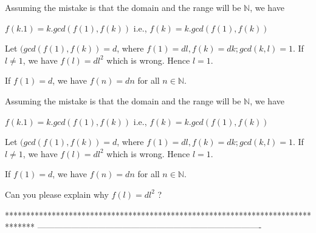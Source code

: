 \begin{solution}
	Assuming the mistake is that the domain and the range will be $\mathbb{N}$, we have

$f(k.1)=k.gcd(f(1),f(k))$
i.e., $f(k)=k.gcd(f(1),f(k))$

Let $(gcd(f(1),f(k))=d$, where $f(1)=dl, f(k)=dk; gcd(k,l)=1.$
If $l\neq 1$, we have $f(l)=dl^2$ which is wrong.
Hence $l=1$.

If $f(1)=d$, we have $f(n)=dn$ for all $n\in \mathbb{N}$.
\end{solution}



\begin{solution}
	\begin{tcolorbox}Assuming the mistake is that the domain and the range will be $\mathbb{N}$, we have

$f(k.1)=k.gcd(f(1),f(k))$
i.e., $f(k)=k.gcd(f(1),f(k))$

Let $(gcd(f(1),f(k))=d$, where $f(1)=dl, f(k)=dk; gcd(k,l)=1.$
If $l\neq 1$, we have $f(l)=dl^2$ which is wrong.
Hence $l=1$.

If $f(1)=d$, we have $f(n)=dn$ for all $n\in \mathbb{N}$.\end{tcolorbox}
Can you please explain why $f(l) = dl^2$ ?
\end{solution}



*******************************************************************************
-------------------------------------------------------------------------------

